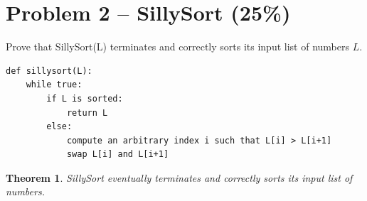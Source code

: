 \documentclass[12pt,letterpaper]{article}
\newtheorem*{thm}{Theorem}
\begin{document}
\newpage

\section*{Problem 2 -- SillySort (25\%)}

Prove that SillySort(L) terminates and correctly sorts its input list of numbers $L$.

     \begin{lstlisting}[style = Python]
def sillysort(L):
    while true:
        if L is sorted:
            return L
        else:
            compute an arbitrary index i such that L[i] > L[i+1]
            swap L[i] and L[i+1]
    \end{lstlisting}

\begin{thm}
    SillySort eventually terminates and correctly sorts its input list of numbers.
\end{thm}
\end{document}
